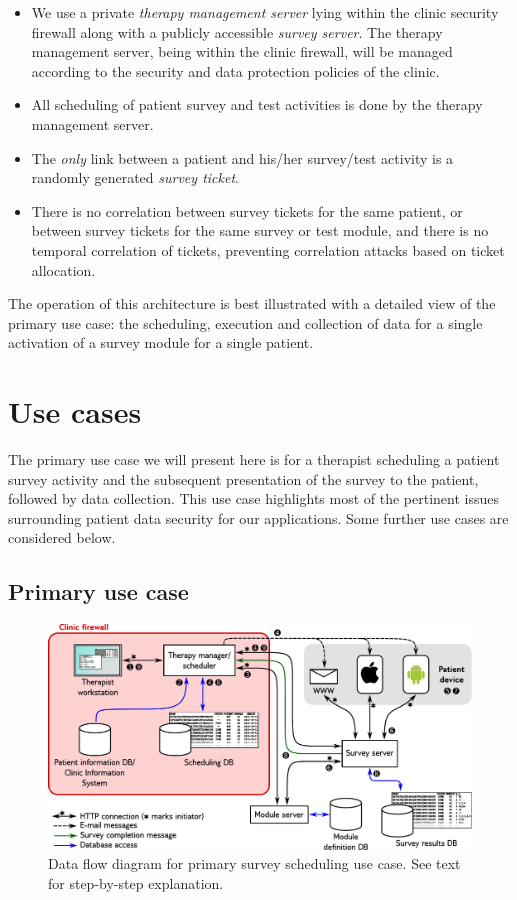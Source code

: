 \documentclass[DIV=calc,paper=a4,fontsize=11pt,twocolumn]{scrartcl}
\begin{document}
\begin{itemize}
  \item{We use a private \emph{therapy management server} lying within
    the clinic security firewall along with a publicly accessible
    \emph{survey server}.  The therapy management server, being within
    the clinic firewall, will be managed according to the security and
    data protection policies of the clinic.}
  \item{All scheduling of patient survey and test activities is done
    by the therapy management server.}
  \item{The \emph{only} link between a patient and his/her survey/test
    activity is a randomly generated \emph{survey ticket}.}
  \item{There is no correlation between survey tickets for the same
    patient, or between survey tickets for the same survey or test
    module, and there is no temporal correlation of tickets,
    preventing correlation attacks based on ticket allocation.}
\end{itemize}

The operation of this architecture is best illustrated with a detailed
view of the primary use case: the scheduling, execution and collection
of data for a single activation of a survey module for a single
patient.


\section*{Use cases}

The primary use case we will present here is for a therapist
scheduling a patient survey activity and the subsequent presentation
of the survey to the patient, followed by data collection.  This use
case highlights most of the pertinent issues surrounding patient data
security for our applications.  Some further use cases are considered
below.

\subsection*{Primary use case}

\begin{figure}
  \begin{center}
    \includegraphics[width=\textwidth]{flow-diagram-en}
  \end{center}
  \caption{Data flow diagram for primary survey scheduling use case.
    See text for step-by-step explanation.}
  \label{fig:flow-diagram}
\end{figure}
\end{document}
